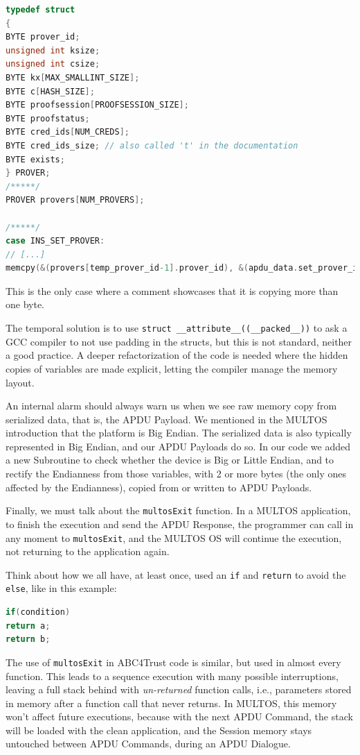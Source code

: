 \documentclass[journal]{IEEEtran}
\begin{document}
\begin{lstlisting}[language=C,frame=tblr]
typedef struct
{
BYTE prover_id;
unsigned int ksize;
unsigned int csize;
BYTE kx[MAX_SMALLINT_SIZE];
BYTE c[HASH_SIZE];
BYTE proofsession[PROOFSESSION_SIZE];
BYTE proofstatus;
BYTE cred_ids[NUM_CREDS];
BYTE cred_ids_size; // also called 't' in the documentation
BYTE exists;
} PROVER;
/*****/
PROVER provers[NUM_PROVERS];

/*****/
case INS_SET_PROVER:
// [...]
memcpy(&(provers[temp_prover_id-1].prover_id), &(apdu_data.set_prover_in.prover_id), 5); // under the hood, this also initializes ksize and csize
\end{lstlisting}
This is the only case where a comment showcases that it is copying more than one byte.

The temporal solution is to use \texttt{struct \_\_attribute\_\_((\_\_packed\_\_))} to ask a GCC compiler to not use padding in the structs, but this is not standard, neither a good practice. A deeper refactorization of the code is needed where the hidden copies of variables are made explicit, letting the compiler manage the memory layout.


\hfil

An internal alarm should always warn us when we see raw memory copy from serialized data, that is, the APDU Payload. We mentioned in the MULTOS introduction that the platform is Big Endian. The serialized data is also typically represented in Big Endian, and our APDU Payloads do so. In our code we added a new Subroutine to check whether the device is Big or Little Endian, and to rectify the Endianness from those variables, with 2 or more bytes (the only ones affected by the Endianness), copied from or written to APDU Payloads.


\hfil


Finally, we must talk about the \texttt{multosExit} function. In a MULTOS application, to finish the execution and send the APDU Response, the programmer can call in any moment to \texttt{multosExit}, and the MULTOS OS will continue the execution, not returning to the application again.

Think about how we all have, at least once, used an \texttt{if} and \texttt{return} to avoid the \texttt{else}, like in this example:

\begin{lstlisting}[language=C]
if(condition)
return a;
return b;
\end{lstlisting}


The use of \texttt{multosExit} in ABC4Trust code is similar, but used in almost every function. This leads to a sequence execution with many possible interruptions, leaving a full stack behind with \textit{un-returned} function calls, i.e., parameters stored in memory after a function call that never returns. In MULTOS, this memory won't affect future executions, because with the next APDU Command, the stack will be loaded with the clean application, and the Session memory stays untouched between APDU Commands, during an APDU Dialogue. 
\end{document}
